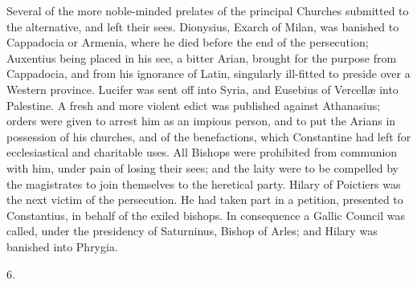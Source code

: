 Several of the more noble-minded prelates of the principal Churches
submitted to the alternative, and left their sees. Dionysius, Exarch
of Milan, was banished to Cappadocia or Armenia, where he died before
the end of the persecution; Auxentius being placed in his see, a
bitter Arian, brought for the purpose from Cappadocia, and from his
ignorance of Latin, singularly ill-fitted to preside over a Western
province. Lucifer was sent off into Syria, and Eusebius of Vercellæ
into Palestine. A fresh and more violent edict was published against
Athanasius; orders were given to arrest him as an impious person, and
to put the Arians in possession of his churches, and of the
benefactions, which Constantine had left for ecclesiastical and
charitable uses. All Bishops were prohibited from communion with
him, under pain of losing their sees; and the laity were to be
compelled by the magistrates to join themselves to the heretical
party. Hilary of Poictiers was the next victim of the persecution. He
had taken part in a petition, presented to Constantius, in behalf of
the exiled bishops. In consequence a Gallic Council was called, under
the presidency of Saturninus, Bishop of Arles; and Hilary was banished
into Phrygia.

6.

